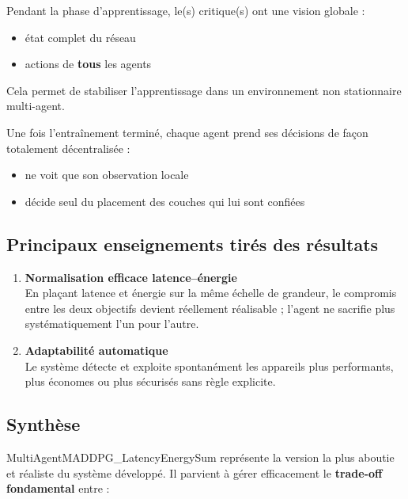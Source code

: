 \documentclass{article}
\begin{document}
\begin{description}[leftmargin=*,font=\normalfont\bfseries]
    \item[Centralized Training] 
    Pendant la phase d’apprentissage, le(s) critique(s) ont une vision globale :
    \begin{itemize}[label=--]
        \item état complet du réseau
        \item actions de \textbf{tous} les agents
    \end{itemize}
    Cela permet de stabiliser l’apprentissage dans un environnement non stationnaire multi-agent.

    \item[Decentralized Execution] 
    Une fois l’entraînement terminé, chaque agent prend ses décisions de façon totalement décentralisée :
    \begin{itemize}[label=--]
        \item ne voit que son observation locale
        \item décide seul du placement des couches qui lui sont confiées
    \end{itemize}
\end{description}

\subsection{Principaux enseignements tirés des résultats}

\begin{enumerate}[label=\arabic*.]
    \item \textbf{Normalisation efficace latence–énergie} \\
    En plaçant latence et énergie sur la même échelle de grandeur, le compromis entre les deux objectifs devient réellement réalisable ; l’agent ne sacrifie plus systématiquement l’un pour l’autre.

    \item \textbf{Adaptabilité automatique} \\
    Le système détecte et exploite spontanément les appareils plus performants, plus économes ou plus sécurisés sans règle explicite.
\end{enumerate}

\subsection{Synthèse}

MultiAgentMADDPG\_LatencyEnergySum représente la version la plus aboutie et réaliste du système développé.  
Il parvient à gérer efficacement le \textbf{trade-off fondamental} entre :
\end{document}
